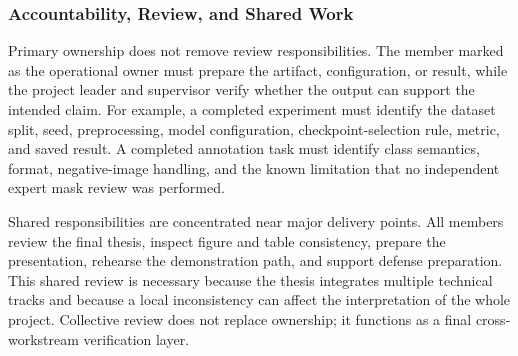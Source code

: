 \documentclass[12pt,a4paper]{report}
\begin{document}
\subsubsection{Accountability, Review, and Shared Work}
Primary ownership does not remove review responsibilities. The member marked as the operational owner must prepare the artifact, configuration, or result, while the project leader and supervisor verify whether the output can support the intended claim. For example, a completed experiment must identify the dataset split, seed, preprocessing, model configuration, checkpoint-selection rule, metric, and saved result. A completed annotation task must identify class semantics, format, negative-image handling, and the known limitation that no independent expert mask review was performed.\par
Shared responsibilities are concentrated near major delivery points. All members review the final thesis, inspect figure and table consistency, prepare the presentation, rehearse the demonstration path, and support defense preparation. This shared review is necessary because the thesis integrates multiple technical tracks and because a local inconsistency can affect the interpretation of the whole project. Collective review does not replace ownership; it functions as a final cross-workstream verification layer.\par
\end{document}
